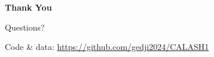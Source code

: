 \documentclass[aspectratio=169, 11pt]{beamer}
\begin{document}
\begin{frame}[plain]
\centering
\vspace{2cm}
{\Huge\textcolor{calash}{\textbf{Thank You}}}

\vspace{1cm}
{\Large Questions?}

\vspace{1.5cm}
{\small Code \& data: \url{https://github.com/gedji2024/CALASH1}}
\end{frame}
\end{document}
